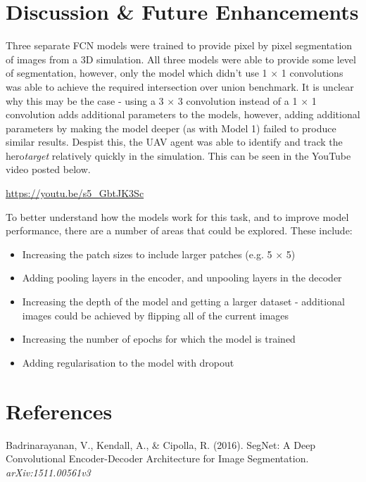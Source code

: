 \documentclass[a4paper]{article}
\begin{document}
\newpage

\section{Discussion \& Future Enhancements}
Three separate FCN models were trained to provide pixel by pixel segmentation of images from a 3D simulation. All three models were able to provide some level of segmentation, however, only the model which didn't use 1 $\times$ 1 convolutions was able to achieve the required intersection over union benchmark. It is unclear why this may be the case - using a 3 $\times$ 3 convolution instead of a 1 $\times$ 1 convolution adds additional parameters to the models, however, adding additional parameters by making the model deeper (as with Model 1) failed to produce similar results. Despist this, the UAV agent was able to identify and track the hero\textit{target} relatively quickly in the simulation. This can be seen in the YouTube video posted below.

\begin{center}
	\url{https://youtu.be/s5_GbtJK3Sc}
\end{center}

To better understand how the models work for this task, and to improve model performance, there are a number of areas that could be explored. These include:
\begin{itemize}
\item Increasing the patch sizes to include larger patches (e.g. 5 $\times$ 5)
\item Adding pooling layers in the encoder, and unpooling layers in the decoder
\item Increasing the depth of the model and getting a larger dataset - additional images could be achieved by flipping all of the current images
\item Increasing the number of epochs for which the model is trained
\item Adding regularisation to the model with dropout
\end{itemize}

\newpage

\section{References}

Badrinarayanan, V., Kendall, A., \& Cipolla, R. (2016). SegNet: A Deep Convolutional Encoder-Decoder Architecture for Image Segmentation. \textit{arXiv:1511.00561v3}\\
\end{document}
